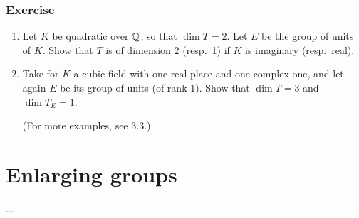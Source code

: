 \subsubsection*{Exercise}
\begin{enumerate}[label=\textit{\alph*}.]
\item Let $K$ be quadratic over $\mathbb{Q}$, so that $\dim T = 2$. Let $E$ be the
	group of units of $K$. Show that $T$ is of dimension 2 (resp.\ 1) if
	$K$ is imaginary (resp.\ real).
\item Take for $K$ a cubic field with one real place and one complex one, and
	let again $E$ be its group of units (of rank 1). Show that $\dim T = 3$
	and $\dim T_E = 1$.

	(For more examples, see 3.3.)\dpage
\end{enumerate}

\section{Enlarging groups}
...
